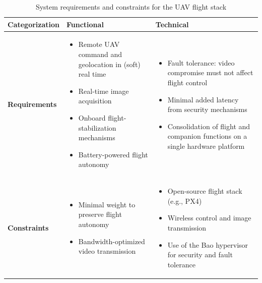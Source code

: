 \begin{table}[t]
  \centering
  \caption{System requirements and constraints for the UAV flight stack}
  \label{tab:requirements}

  \begingroup
  \small %
  \setlength{\tabcolsep}{6pt}     %
  \renewcommand{\arraystretch}{1.05} %

  \begin{tabularx}{\textwidth}{
    >{\raggedright\arraybackslash}p{}  %
    >{\raggedright\arraybackslash}X                   %
    >{\raggedright\arraybackslash}X                   %
  }
    \toprule
    \textbf{Categorization} & \textbf{Functional} & \textbf{Technical} \\
    \midrule
    \textbf{Requirements} &
    \begin{itemize}[leftmargin=*,nosep,topsep=0pt]
      \item Remote UAV command and geolocation in (soft) real time
      \item Real-time image acquisition
      \item Onboard flight-stabilization mechanisms
      \item Battery-powered flight autonomy
    \end{itemize}
    &
    \begin{itemize}[leftmargin=*,nosep,topsep=0pt]
      \item Fault tolerance: video compromise must not affect flight control
      \item Minimal added latency from security mechanisms
      \item Consolidation of flight and companion functions on a single hardware platform
    \end{itemize}
    \\
    \addlinespace[0.3em]
    \textbf{Constraints} &
    \begin{itemize}[leftmargin=*,nosep,topsep=0pt]
      \item Minimal weight to preserve flight autonomy
      \item Bandwidth-optimized video transmission
    \end{itemize}
    &
    \begin{itemize}[leftmargin=*,nosep,topsep=0pt]
      \item Open-source flight stack (e.g., PX4)
      \item Wireless control and image transmission
      \item Use of the Bao hypervisor for security and fault tolerance
    \end{itemize}
    \\
    \bottomrule
  \end{tabularx}
  \endgroup
\end{table}

